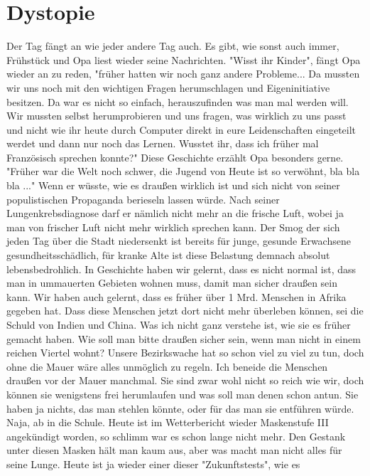 \documentclass[twoside, a4paper, DIV=11, open=any, bibliography=totoc]{scrbook}
\begin{document}
\section*{Dystopie} \label{sec:szendystopie}

Der Tag fängt an wie jeder andere Tag auch. Es gibt, wie sonst auch immer,
Frühstück und Opa liest wieder
seine Nachrichten. "Wisst ihr Kinder", fängt Opa wieder an zu reden, "früher hatten
wir noch ganz andere
Probleme... Da mussten wir uns noch mit den wichtigen Fragen herumschlagen und
Eigeninitiative besitzen.
Da war es nicht so einfach, herauszufinden was man mal werden will. Wir mussten
selbst herumprobieren und
uns fragen, was wirklich zu uns passt und nicht wie ihr heute durch Computer direkt
in eure Leidenschaften
eingeteilt werdet und dann nur noch das Lernen. Wusstet ihr, dass ich früher mal
Französisch sprechen konnte?"
Diese Geschichte erzählt Opa besonders gerne.
"Früher war die Welt noch schwer, die
Jugend von Heute ist so
verwöhnt, bla bla bla ..." Wenn er wüsste, wie es draußen wirklich ist und sich
nicht von seiner
populistischen Propaganda berieseln lassen würde.
Nach seiner Lungenkrebsdiagnose darf er nämlich nicht mehr an die frische Luft,
wobei ja man von frischer Luft nicht mehr wirklich sprechen kann.
Der Smog der sich jeden Tag über die Stadt niedersenkt ist bereits für
junge, gesunde Erwachsene gesundheitsschädlich, für kranke Alte ist diese
Belastung demnach absolut lebensbedrohlich.
In Geschichte haben wir gelernt, dass es nicht normal ist, dass man in ummauerten
Gebieten wohnen muss, damit
man sicher draußen sein kann. Wir haben auch gelernt, dass es früher über 1 Mrd.
Menschen in Afrika gegeben hat.
Dass diese Menschen jetzt dort nicht mehr überleben können, sei die Schuld von
Indien und China.
Was ich nicht ganz
verstehe ist, wie sie es früher gemacht haben. Wie soll man bitte draußen sicher
sein, wenn man nicht in einem
reichen Viertel wohnt? Unsere Bezirkswache hat so schon viel zu viel zu tun, doch
ohne die Mauer wäre alles
unmöglich zu regeln. Ich beneide die Menschen draußen vor der Mauer manchmal.
Sie sind zwar wohl nicht so reich wie wir, doch können sie wenigstens frei
herumlaufen und was soll
man denen schon antun. Sie haben ja nichts, das man stehlen könnte, oder für das
man sie entführen würde.
Naja, ab in die Schule. 
Heute ist im Wetterbericht wieder Maskenstufe III angekündigt worden,
so schlimm war es schon lange nicht mehr. Den Gestank unter diesen Masken hält man kaum
aus, aber was macht man nicht alles für seine Lunge.
Heute ist ja wieder einer dieser "Zukunftstests", wie es
\end{document}
